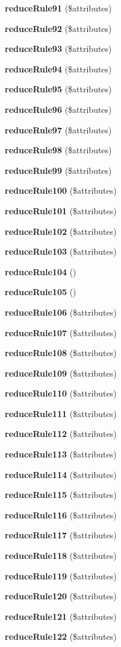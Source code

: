 \begin{DoxyCompactItemize}
{\bf reduce\+Rule91} (\$attributes)
\item 
{\bf reduce\+Rule92} (\$attributes)
\item 
{\bf reduce\+Rule93} (\$attributes)
\item 
{\bf reduce\+Rule94} (\$attributes)
\item 
{\bf reduce\+Rule95} (\$attributes)
\item 
{\bf reduce\+Rule96} (\$attributes)
\item 
{\bf reduce\+Rule97} (\$attributes)
\item 
{\bf reduce\+Rule98} (\$attributes)
\item 
{\bf reduce\+Rule99} (\$attributes)
\item 
{\bf reduce\+Rule100} (\$attributes)
\item 
{\bf reduce\+Rule101} (\$attributes)
\item 
{\bf reduce\+Rule102} (\$attributes)
\item 
{\bf reduce\+Rule103} (\$attributes)
\item 
{\bf reduce\+Rule104} ()
\item 
{\bf reduce\+Rule105} ()
\item 
{\bf reduce\+Rule106} (\$attributes)
\item 
{\bf reduce\+Rule107} (\$attributes)
\item 
{\bf reduce\+Rule108} (\$attributes)
\item 
{\bf reduce\+Rule109} (\$attributes)
\item 
{\bf reduce\+Rule110} (\$attributes)
\item 
{\bf reduce\+Rule111} (\$attributes)
\item 
{\bf reduce\+Rule112} (\$attributes)
\item 
{\bf reduce\+Rule113} (\$attributes)
\item 
{\bf reduce\+Rule114} (\$attributes)
\item 
{\bf reduce\+Rule115} (\$attributes)
\item 
{\bf reduce\+Rule116} (\$attributes)
\item 
{\bf reduce\+Rule117} (\$attributes)
\item 
{\bf reduce\+Rule118} (\$attributes)
\item 
{\bf reduce\+Rule119} (\$attributes)
\item 
{\bf reduce\+Rule120} (\$attributes)
\item 
{\bf reduce\+Rule121} (\$attributes)
\item 
{\bf reduce\+Rule122} (\$attributes)

\end{DoxyCompactItemize}
